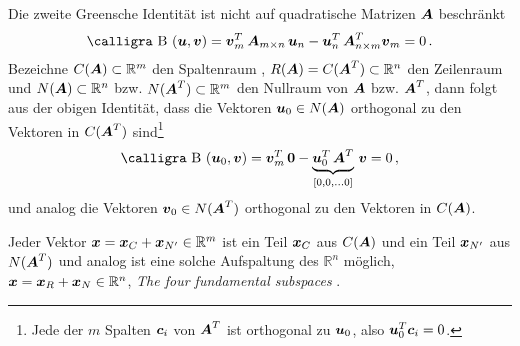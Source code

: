 Die zweite Greensche Identit\"{a}t  ist nicht auf quadratische Matrizen $\mbox{\boldmath $A$}$ beschr\"{a}nkt
\begin{align}
\text{\normalfont\calligra B\,\,}(\vek u,\vek v)  = \vek v_m^T\,\vek A_{m \times n}\,\vek u_{n} - \vek u^T_n\,\vek A^T_{n \times m}\vek v_m = 0\,.
\end{align}
Bezeichne $C(\mbox{\boldmath $A$}) \subset \mathbb{R}^m$ den Spaltenraum , $R(\mbox{\boldmath $A$}) = C(\mbox{\boldmath $A$}^T) \subset \mathbb{R}^n$ den Zeilenraum  und $N(\mbox{\boldmath $A$}) \subset \mathbb{R}^n$ bzw. $N(\mbox{\boldmath $A$}^T) \subset \mathbb{R}^m$ den Nullraum  von $\mbox{\boldmath $A$} $ bzw. $\mbox{\boldmath $A$}^T$, dann folgt aus der obigen Identit\"{a}t, dass die Vektoren $\mbox{\boldmath $u$}_0 \in N(\mbox{\boldmath $A$})$ orthogonal zu den Vektoren in $C(\mbox{\boldmath $A$}^T)$ sind\footnote{Jede der $m$ Spalten $\mbox{\boldmath $c$}_i$ von $\mbox{\boldmath $A$}^T$ ist orthogonal zu $\mbox{\boldmath $u$}_0$, also $\mbox{\boldmath $u$}_0^T \mbox{\boldmath $c$}_i = 0$.}
\begin{align}
\text{\normalfont\calligra B\,\,}(\vek u_0,\vek v)  = \vek v_m^T\,\vek 0 - \underbrace{\vek u_0^T \,\vek A^T}_{[0,0,\ldots 0]}\,\vek v = 0\,,
\end{align}
und analog die Vektoren $\mbox{\boldmath $v$}_0 \in N(\mbox{\boldmath $A$}^T)$ orthogonal zu den Vektoren in $C(\mbox{\boldmath $A$})$.

Jeder Vektor $\mbox{\boldmath $x$} = \mbox{\boldmath $x$}_C + \mbox{\boldmath $x$}_{N'} \in \mathbb{R}^m$ ist ein Teil $\mbox{\boldmath $x$}_C$ aus $C(\mbox{\boldmath $A$})$ und ein Teil $\mbox{\boldmath $x$}_{N'}$ aus $N(\mbox{\boldmath $A$}^T)$ und analog ist eine solche Aufspaltung des $\mathbb{R}^n$ m\"{o}glich, $\mbox{\boldmath $x$} = \mbox{\boldmath $x$}_R + \mbox{\boldmath $x$}_N \in \mathbb{R}^n$, {\em \glq The four fundamental subspaces\grq{}\/} \cite{Strang4}.

